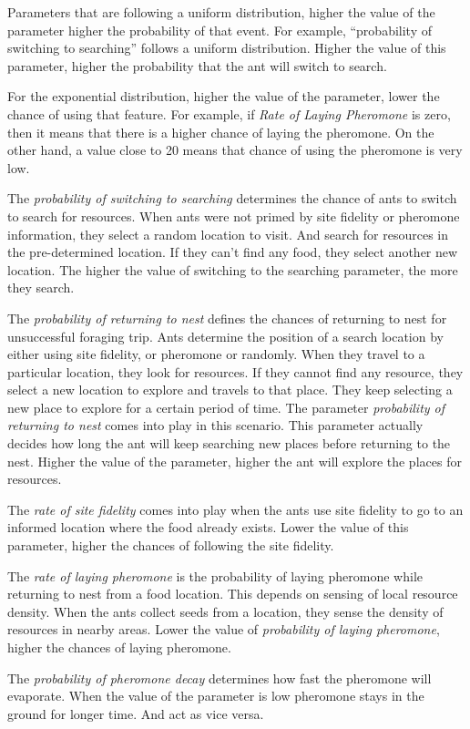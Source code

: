 Parameters that are following a uniform distribution, higher the value of the parameter higher the probability of that event. For example, ``probability of switching to searching'' follows a uniform distribution. Higher the value of this parameter, higher the probability that the ant will switch to search. \par
For the exponential distribution, higher the value of the parameter, lower the chance of using that feature. For example, if \textit{Rate of Laying Pheromone} is zero, then it means that there is a higher chance of laying the pheromone. On the other hand,  a value close to 20 means that chance of using the pheromone is very low.\par 
The \textit{probability of switching to searching} determines the chance of ants to switch to search for resources. When ants were not primed by site fidelity or pheromone information, they select a random location to visit. And search for resources in the pre-determined location. If they can’t find any food, they select another new location. The higher the value of switching to the searching parameter, the more they search.\par 
The \textit{probability of returning to nest} defines the chances of returning to nest for unsuccessful foraging trip. Ants determine the position of a search location by either using site fidelity, or pheromone or randomly. When they travel to a particular location, they look for resources. If they cannot find any resource, they select a new location to explore and travels to that place. They keep selecting a new place to explore for a certain period of time. The parameter \textit{probability of returning to nest} comes into play in this scenario. This parameter actually decides how long the ant will keep searching new places before returning to the nest. Higher the value of the parameter, higher the ant will explore the places for resources.\par 
The \textit{rate of site fidelity} comes into play when the ants use site fidelity to go to an informed location where the food already exists. Lower the value of this parameter, higher the chances of following the site fidelity. \par 
The \textit{rate of laying pheromone} is the probability of laying pheromone while returning to nest from a food location. This depends on sensing of local resource density. When the ants collect seeds from a location, they sense the density of resources in nearby areas. Lower the value of \textit{probability of laying pheromone}, higher the chances of laying pheromone. \par 
The \textit{probability of pheromone decay} determines how fast the pheromone will evaporate. When the value of the parameter is low pheromone stays in the ground for longer time. And act as vice versa.
